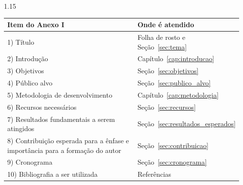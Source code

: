 \begin{spacing}{1.15}
\noindent
\begin{tabular}{@{}p{0.56\linewidth}p{0.40\linewidth}@{}}
\toprule
\textbf{Item do Anexo I} & \textbf{Onde é atendido} \\
\midrule
1) Título & Folha de rosto e Seção~\ref{sec:tema} \\[0.35em]
2) Introdução & Capítulo~\ref{cap:introducao} \\[0.35em]
3) Objetivos & Seção~\ref{sec:objetivos} \\[0.35em]
4) Público alvo & Seção~\ref{sec:publico_alvo} \\[0.35em]
5) Metodologia de desenvolvimento & Capítulo~\ref{cap:metodologia} \\[0.35em]
6) Recursos necessários & Seção~\ref{sec:recursos} \\[0.35em]
7) Resultados fundamentais a serem atingidos & Seção~\ref{sec:resultados_esperados}
\\[0.35em]
8) Contribuição esperada para a ênfase e importância para a formação do autor &
Seção~\ref{sec:contribuicao} \\[0.35em]
9) Cronograma & Seção~\ref{sec:cronograma} \\[0.35em]
10) Bibliografia a ser utilizada & Referências \\
\bottomrule
\end{tabular}

\end{spacing}

\vfill
\cleardoublepage

